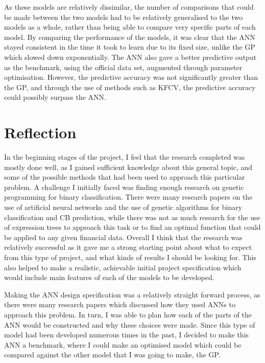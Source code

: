\documentclass[11pt]{article}
\begin{document}
As these models are relatively dissimilar, the number of comparisons that could be made between the two models had to be relatively generalised to the two models as a whole, rather than being able to compare very specific parts of each model. By comparing the performance of the models, it was clear that the ANN stayed consistent in the time it took to learn due to its fixed size, unlike the GP which slowed down exponentially. The ANN also gave a better predictive output as the benchmark, using the official data set, augmented through parameter optimisation. However, the predictive accuracy was not significantly greater than the GP, and through the use of methods such as KFCV, the predictive accuracy could possibly surpass the ANN. 
\section{Reflection}\label{sec:Refl}
In the beginning stages of the project, I feel that the research completed was mostly done well, as I gained sufficient knowledge about this general topic, and some of the possible methods that had been used to approach this particular problem. A challenge I initially faced was finding enough research on genetic programming for binary classification. There were many research papers on the use of artificial neural networks and the use of genetic algorithms for binary classification and CB prediction, while there was not as much research for the use of expression trees to approach this task or to find an optimal function that could be applied to any given financial data. Overall I think that the research was relatively successful as it gave me a strong starting point about what to expect from this type of project, and what kinds of results I should be looking for. This also helped to make a realistic, achievable initial project specification which would include main features of each of the models to be developed.

Making the ANN design specification was a relatively straight forward process, as there were many research papers which discussed how they used ANNs to approach this problem. In turn, I was able to plan how each of the parts of the ANN would be constructed and why these choices were made. Since this type of model had been developed numerous times in the past, I decided to make this ANN a benchmark, where I could make an optimised model which could be compared against the other model that I was going to make, the GP. 
\end{document}
